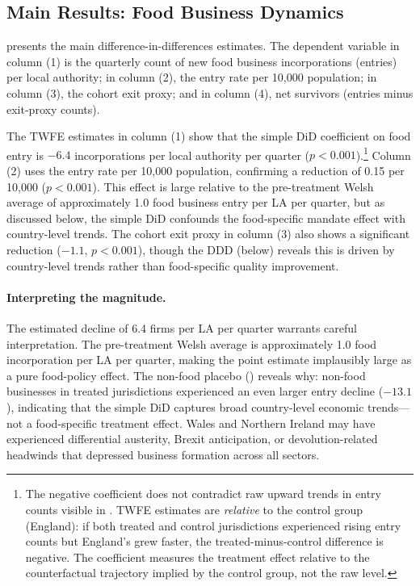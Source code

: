 \documentclass[12pt]{article}
\begin{document}
\subsection{Main Results: Food Business Dynamics}



 presents the main difference-in-differences estimates. The dependent variable in column (1) is the quarterly count of new food business incorporations (entries) per local authority; in column (2), the entry rate per 10,000 population; in column (3), the cohort exit proxy; and in column (4), net survivors (entries minus exit-proxy counts).

The TWFE estimates in column (1) show that the simple DiD coefficient on food entry is $-6.4$ incorporations per local authority per quarter ($p < 0.001$).\footnote{The negative coefficient does not contradict raw upward trends in entry counts visible in . TWFE estimates are \textit{relative} to the control group (England): if both treated and control jurisdictions experienced rising entry counts but England's grew faster, the treated-minus-control difference is negative. The coefficient measures the treatment effect relative to the counterfactual trajectory implied by the control group, not the raw level.} Column (2) uses the entry rate per 10,000 population, confirming a reduction of 0.15 per 10,000 ($p < 0.001$). This effect is large relative to the pre-treatment Welsh average of approximately 1.0 food business entry per LA per quarter, but as discussed below, the simple DiD confounds the food-specific mandate effect with country-level trends. The cohort exit proxy in column (3) also shows a significant reduction ($-1.1$, $p < 0.001$), though the DDD (below) reveals this is driven by country-level trends rather than food-specific quality improvement.

\paragraph{Interpreting the magnitude.} The estimated decline of 6.4 firms per LA per quarter warrants careful interpretation. The pre-treatment Welsh average is approximately 1.0 food incorporation per LA per quarter, making the point estimate implausibly large as a pure food-policy effect. The non-food placebo () reveals why: non-food businesses in treated jurisdictions experienced an even larger entry decline ($-13.1$), indicating that the simple DiD captures broad country-level economic trends---not a food-specific treatment effect. Wales and Northern Ireland may have experienced differential austerity, Brexit anticipation, or devolution-related headwinds that depressed business formation across all sectors.
\end{document}

